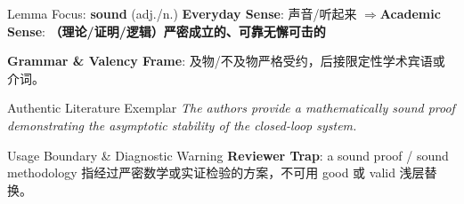 \begin{ConceptBox}{Lemma Focus: \textbf{sound} (adj./n.)}
\textbf{Everyday Sense}: 声音/听起来 \quad$\Longrightarrow$\quad \textbf{Academic Sense}: \textbf{（理论/证明/逻辑）严密成立的、可靠无懈可击的}\par\vspace{3pt}
\textbf{Grammar \& Valency Frame}: 及物/不及物严格受约，后接限定性学术宾语或介词。\par
\end{ConceptBox}
\begin{ExampleBox}{Authentic Literature Exemplar}
\textit{The authors provide a mathematically sound proof demonstrating the asymptotic stability of the closed-loop system.}
\end{ExampleBox}
\begin{TipBox}{Usage Boundary \& Diagnostic Warning}
\textbf{Reviewer Trap}: a sound proof / sound methodology 指经过严密数学或实证检验的方案，不可用 good 或 valid 浅层替换。
\end{TipBox}
\vspace{6pt}
